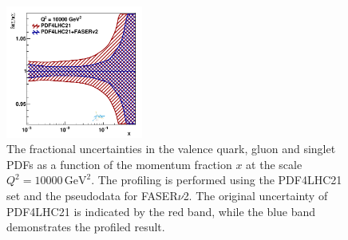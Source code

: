\begin{figure}[H]
\includegraphics[width=0.4\textwidth]{./figs_xFitter/FASERv2_q2_10000_pdf_Sea_ratio.pdf}
\caption{The fractional uncertainties in the valence quark, gluon and singlet PDFs as a function of the momentum fraction $x$ at the scale $Q^2 = 10000 \, \textrm{GeV}^2$. The profiling is performed using the
PDF4LHC21 set and the pseudodata for FASER$\nu$2. The original uncertainty of PDF4LHC21 is
indicated by the red band, while the blue band demonstrates the profiled result.}
\label{FASERv2_profiling}
\end{figure}

